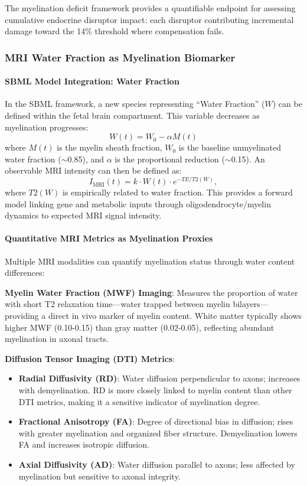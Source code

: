 \documentclass[11pt]{article}
\let\oldsubsubsection\subsubsection
\renewcommand{\subsubsection}[1]{\oldsubsubsection{#1}\setlength{\leftskip}{1.5em}}
\begin{document}
The myelination deficit framework provides a quantifiable endpoint for assessing cumulative endocrine disruptor impact: each disruptor contributing incremental damage toward the 14\% threshold where compensation fails.

\subsubsection{MRI Water Fraction as Myelination Biomarker}

\paragraph{SBML Model Integration: Water Fraction}
In the SBML framework, a new species representing ``Water Fraction'' ($W$) can be defined within the fetal brain compartment. This variable decreases as myelination progresses:
\begin{equation}
W(t) = W_0 - \alpha M(t)
\end{equation}
where $M(t)$ is the myelin sheath fraction, $W_0$ is the baseline unmyelinated water fraction ($\sim$0.85), and $\alpha$ is the proportional reduction ($\sim$0.15). An observable MRI intensity can then be defined as:
\begin{equation}
I_{\text{MRI}}(t) = k \cdot W(t) \cdot e^{-TE/T2(W)},
\end{equation}
where $T2(W)$ is empirically related to water fraction. This provides a forward model linking gene and metabolic inputs through oligodendrocyte/myelin dynamics to expected MRI signal intensity.

\paragraph{Quantitative MRI Metrics as Myelination Proxies}
Multiple MRI modalities can quantify myelination status through water content differences:

\textbf{Myelin Water Fraction (MWF) Imaging}: Measures the proportion of water with short T2 relaxation time—water trapped between myelin bilayers—providing a direct in vivo marker of myelin content. White matter typically shows higher MWF (0.10-0.15) than gray matter (0.02-0.05), reflecting abundant myelination in axonal tracts.

\textbf{Diffusion Tensor Imaging (DTI) Metrics}:
\begin{itemize}
\item \textbf{Radial Diffusivity (RD)}: Water diffusion perpendicular to axons; increases with demyelination. RD is more closely linked to myelin content than other DTI metrics, making it a sensitive indicator of myelination degree.
\item \textbf{Fractional Anisotropy (FA)}: Degree of directional bias in diffusion; rises with greater myelination and organized fiber structure. Demyelination lowers FA and increases isotropic diffusion.
\item \textbf{Axial Diffusivity (AD)}: Water diffusion parallel to axons; less affected by myelination but sensitive to axonal integrity.
\end{itemize}
\end{document}
